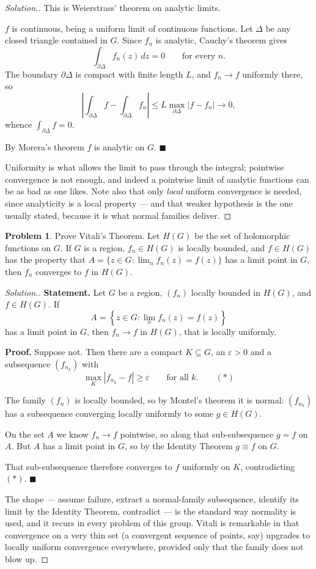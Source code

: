\documentclass[11pt,a4paper]{article}
\theoremstyle{definition}
\newtheorem{problemx}{Problem}[section]
\newenvironment{problem}{\begin{problemx}}{\end{problemx}}
\newenvironment{solution}
  {\renewcommand{\qedsymbol}{}\begin{proof}[\textit{Solution}.]}
  {\end{proof}}
\begin{document}
\begin{solution}
This is Weierstrass' theorem on analytic limits.

$f$ is continuous, being a uniform limit of continuous functions. Let $\Delta$ be
any closed triangle contained in $G$. Since $f_n$ is analytic, Cauchy's theorem
gives
$$\int_{\partial\Delta} f_n(z)\,dz = 0 \qquad\text{for every } n .$$
The boundary $\partial\Delta$ is compact with finite length $L$, and
$f_n \rightarrow f$ uniformly there, so
$$\left|\int_{\partial\Delta} f - \int_{\partial\Delta} f_n\right|
\leq L \max_{\partial\Delta}\left|f - f_n\right| \longrightarrow 0 ,$$
whence $\int_{\partial\Delta} f = 0$.

By Morera's theorem $f$ is analytic on $G$. $\blacksquare$

Uniformity is what allows the limit to pass through the integral; pointwise
convergence is not enough, and indeed a pointwise limit of analytic functions can
be as bad as one likes. Note also that only \emph{local} uniform convergence is
needed, since analyticity is a local property --- and that weaker hypothesis is the
one usually stated, because it is what normal families deliver.
\end{solution}


\begin{problem}
Prove Vitali's Theorem. Let $H(G)$ be the set of holomorphic functions on $G$. If
$G$ is a region, $f_n \in H(G)$ is locally bounded, and $f \in H(G)$ has the
property that $A = \{z \in G : \lim_n f_n(z) = f(z)\}$ has a limit point in $G$,
then $f_n$ converges to $f$ in $H(G)$.
\end{problem}

\begin{solution}
\textbf{Statement.} Let $G$ be a region, $(f_n)$ locally bounded in $H(G)$, and
$f \in H(G)$. If
$$A = \left\{z \in G : \lim_n f_n(z) = f(z)\right\}$$
has a limit point in $G$, then $f_n \rightarrow f$ in $H(G)$, that is locally
uniformly.

\textbf{Proof.} Suppose not. Then there are a compact $K \subseteq G$, an
$\varepsilon > 0$ and a subsequence $(f_{n_k})$ with
$$\max_{K}\left|f_{n_k} - f\right| \geq \varepsilon \qquad\text{for all } k. \qquad (*)$$

The family $(f_n)$ is locally bounded, so by Montel's theorem it is normal:
$(f_{n_k})$ has a subsequence converging locally uniformly to some $g \in H(G)$.

On the set $A$ we know $f_n \rightarrow f$ pointwise, so along that
sub-subsequence $g = f$ on $A$. But $A$ has a limit point in $G$, so by the
Identity Theorem $g \equiv f$ on $G$.

That sub-subsequence therefore converges to $f$ uniformly on $K$, contradicting
$(*)$. $\blacksquare$

The shape --- assume failure, extract a normal-family subsequence, identify its
limit by the Identity Theorem, contradict --- is the standard way normality is used,
and it recurs in every problem of this group. Vitali is remarkable in that
convergence on a very thin set (a convergent sequence of points, say) upgrades to
locally uniform convergence everywhere, provided only that the family does not
blow up.
\end{solution}
\end{document}
